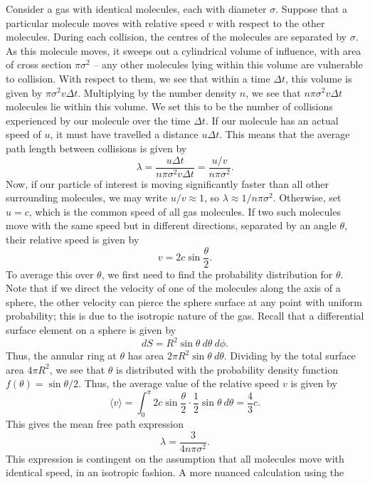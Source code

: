 \documentclass[11pt]{article}
\newcommand\E[1]{\langle #1 \rangle}
\theoremstyle{definition}
\theoremstyle{remark}
\numberwithin{equation}{section}
\begin{document}
    Consider a gas with identical molecules, each with diameter $\sigma$.  Suppose
    that a particular molecule moves with relative speed $v$ with respect to the
    other molecules. During each collision, the centres of the molecules are
    separated by $\sigma$. As this molecule moves, it sweeps out a cylindrical
    volume of influence, with area of cross section $\pi \sigma^2$ -- any other
    molecules lying within this volume are vulnerable to collision. With respect to
    them, we see that within a time $\Delta t$, this volume is given by $\pi
    \sigma^2 v\Delta t$. Multiplying by the number density $n$, we see that
    $n\pi\sigma^2 v\Delta t$ molecules lie within this volume. We set this to be the
    number of collisions experienced by our molecule over the time $\Delta t$. If
    our molecule has an actual speed of $u$, it must have travelled a distance $u
    \Delta t$. This means that the average path length between collisions is given
    by \[
        \lambda = \frac{u\Delta t}{n\pi \sigma^2 v \Delta t} = \frac{u /
        v}{n\pi\sigma^2}.
    \] Now, if our particle of interest is moving significantly faster than all
    other surrounding molecules, we may write $u /v \approx 1$, so $\lambda \approx
    1 /n\pi\sigma^2$. Otherwise, set $u = c$, which is the common speed of all gas
    molecules. If two such molecules move with the same speed but in different
    directions, separated by an angle $\theta$, their relative speed is given by \[
        v = 2c\sin\frac{\theta}{2}.
    \] To average this over $\theta$, we first need to find the probability
    distribution for $\theta$. Note that if we direct the velocity of one of the
    molecules along the axis of a sphere, the other velocity can pierce the sphere
    surface at any point with uniform probability; this is due to the isotropic
    nature of the gas. Recall that a differential surface element on a sphere is
    given by \[
        dS = R^2\sin\theta \:d\theta \:d\phi.
    \] Thus, the annular ring at $\theta$ has area $2\pi R^2 \sin\theta \:d\theta$.
    Dividing by the total surface area $4\pi R^2$, we see that $\theta$ is
    distributed with the probability density function $f(\theta) = \sin\theta /2$.
    Thus, the average value of the relative speed $v$ is given by \[
        \E{v} = \int_0^\pi 2c \sin\frac{\theta}{2}\cdot \frac{1}{2} \sin\theta 
        \:d\theta = \frac{4}{3}c.
    \] This gives the mean free path expression \[
        \lambda = \frac{3}{4n\pi\sigma^2}.
    \] This expression is contingent on the assumption that all molecules move with
    identical speed, in an isotropic fashion. A more nuanced calculation using the
\end{document}
